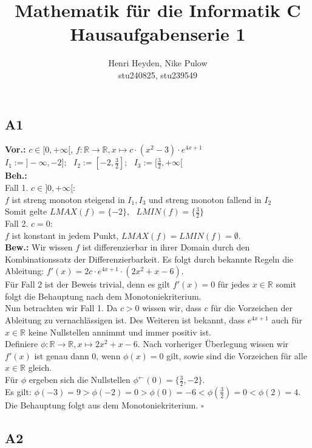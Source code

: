 \documentclass[12pt, a4paper]{article}
\title{Mathematik für die Informatik C\\Hausaufgabenserie 1}
\author{Henri Heyden, Nike Pulow \\ \small stu240825, stu239549}
\date{}
\newcommand*{\qed}{\null\nobreak\hfill\ensuremath{\square}}
\newcommand*{\gap}{\text{ }}
\newcommand*{\vor}{\textbf{Vor.:} \gap}
\newcommand*{\beh}{\textbf{Beh.:} \gap}
\newcommand*{\bew}{\textbf{Bew.:} \gap}
\begin{document}
\maketitle

\doublespacing
\subsection*{A1}
    \vor
        \(c \in [0, +\infty[\), \gap \(f : \mathbb R \rightarrow \mathbb R, x \mapsto c\cdot (x^2-3)\cdot e^{4x+1}\) \\
        \(I_1 := ]-\infty, -2]; \gap I_2 := [-2, \frac{3}{2}]; \gap I_3 := [\frac{3}{2}, +\infty[\) \\
    \beh \\
        Fall 1. \(c \in ]0, +\infty[\): \\ \(f\) ist streng monoton steigend in \(I_1, I_3\) und streng monoton fallend in \(I_2\) \\
        Somit gelte \(LMAX(f) = \{-2\}, \gap LMIN(f) = \{\frac{3}{2}\}\) \\
        Fall 2. \(c = 0\): \\ \(f\) ist konstant in jedem Punkt, \(LMAX(f) = LMIN(f) = \emptyset\). \\
    \bew Wir wissen \(f\) ist differenzierbar in ihrer Domain durch den Kombinationssatz der Differenzierbarkeit. Es folgt durch bekannte Regeln die Ableitung: \(f'(x) = 2c \cdot e^{4x+1} \cdot (2x^2+x-6)\).\\
    Für Fall 2 ist der Beweis trivial, denn es gilt \(f'(x) = 0\) für jedes \(x \in \mathbb R\) somit folgt die Behauptung nach dem Monotoniekriterium. \\
    Nun betrachten wir Fall 1. Da \(c > 0\) wissen wir, dass \(c\) für die Vorzeichen der Ableitung zu vernachlässigen ist. Des Weiteren ist bekannt, dass \(e^{4x+1}\) auch für \(x \in \mathbb R\) keine Nullstellen annimmt und immer positiv ist. \\
    Definiere \(\phi : \mathbb R \rightarrow \mathbb R, x \mapsto 2x^2+x-6\). Nach vorheriger Überlegung wissen wir \(f'(x)\) ist genau dann \(0\), wenn \(\phi(x) = 0\) gilt, sowie sind die Vorzeichen für alle \(x\in \mathbb R\) gleich. \\
    Für \(\phi\) ergeben sich die Nullstellen \(\phi^{\leftarrow}(0) = \{\frac{3}{2}, -2\}\). \\
    Es gilt: \(\phi(-3) = 9 > \phi(-2) = 0 > \phi(0) = -6 < \phi(\frac{3}{2}) = 0 < \phi(2) = 4\).\\ 
    Die Behauptung folgt aus dem Monotoniekriterium. \qed
\subsection*{A2}
\end{document}
